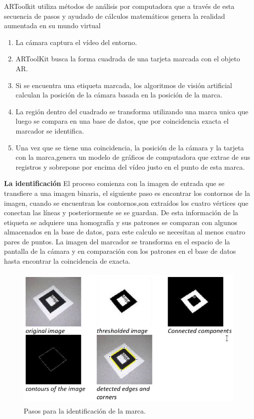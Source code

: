 ARToolkit utiliza métodos de análisis por computadora que a través de esta secuencia de pasos y ayudado de cálculos matemáticos genera la realidad aumentada en su mundo virtual \par
\begin{enumerate}[1.]
	\item  La cámara captura el vídeo del entorno.
	\item ARToolKit busca la forma cuadrada de una tarjeta marcada con el objeto AR.
	\item Si se encuentra una etiqueta marcada, los algoritmos de visión artificial calculan la posición de la cámara basada en la posición de la marca.
	\item La región dentro del cuadrado se transforma utilizando una marca unica que luego se compara en una
	base de datos, que por coincidencia exacta el marcador se identifica.
	\item Una vez que se tiene una coincidencia, la posición de la cámara y la tarjeta con la marca,genera un modelo de gráficos de computadora que extrae de sus registros y sobrepone por encima del vídeo justo en el punto de esta marca.
\end{enumerate}

\textbf{La identificación}
El proceso comienza con la imagen de entrada que se transfiere a una imagen binaria, el siguiente paso es encontrar los contornos de la imagen, cuando se encuentran los contornos,son extraídos los cuatro vértices que conectan las líneas y posteriormente se se guardan. De esta información de la etiqueta se adquiere una homografía y sus patrones se comparan con algunos almacenados en la base de datos, para este calculo se necesitan al menos cuatro pares de puntos. La imagen del marcador se transforma en el espacio de la pantalla de la cámara y en comparación con los patrones en el
base de datos hasta encontrar la coincidencia de exacta.
\begin{figure}[h!]
	\centering
	\includegraphics[width=14cm,height=7cm]{imagenes/marcoteorico/plataformas/squareMarkersARtookik.png}
	\caption{Pasos para la identificación de la marca.\cite{B13}}
	\label{fig:analogo}
\end{figure}
\newpage

